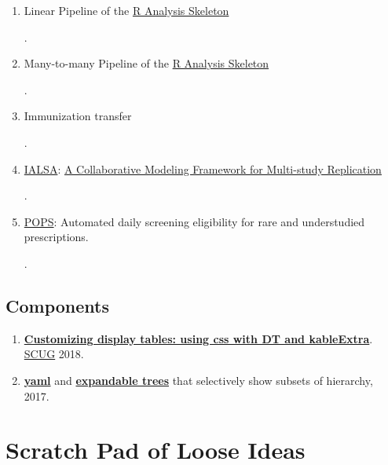 \documentclass[
]{book}
\providecommand{\tightlist}{%
  \setlength{\itemsep}{0pt}\setlength{\parskip}{0pt}}
\begin{document}
\begin{enumerate}
\def\labelenumi{\arabic{enumi}.}
\item
  Linear Pipeline of the \href{https://github.com/wibeasley/RAnalysisSkeleton}{R Analysis Skeleton}

  .
\item
  Many-to-many Pipeline of the \href{https://github.com/wibeasley/RAnalysisSkeleton}{R Analysis Skeleton}

  .
\item
  Immunization transfer

  .
\item
  \href{http://www.ialsa.org/}{IALSA}: \href{https://github.com/IALSA/IALSA-2015-Portland/blob/master/pubs/2016-talks/2016-06-09-cpa/ppt/koval-etal-2016-06-10-cpa.pdf}{A Collaborative Modeling Framework for Multi-study Replication}

  .
\item
  \href{https://github.com/OuhscBbmc/darden-pharmaco-1}{POPS}: Automated daily screening eligibility for rare and understudied prescriptions.

  .
\end{enumerate}

\hypertarget{components}{%
\section{Components}\label{components}}

\begin{enumerate}
\def\labelenumi{\arabic{enumi}.}
\tightlist
\item
  \textbf{\href{https://raw.githack.com/OuhscBbmc/StatisticalComputing/master/2018-presentations/10-october/table-styling.html\#/}{Customizing display tables: using css with DT and kableExtra}}. \href{https://github.com/OuhscBbmc/StatisticalComputing}{SCUG} 2018.
\item
  \textbf{\href{https://github.com/wibeasley/class-yaml-2017/blob/master/data-public/raw/miechv-3-outcome-measure.yml}{yaml}} and \textbf{\href{https://rawcdn.githack.com/wibeasley/class-yaml-2017/55ad75a9f69b03fde929c06bb3ec129f25c816a9/analysis/miechv-3-measures/miechv-3-measures.html\#4_trees}{expandable trees}} that selectively show subsets of hierarchy, 2017.
\end{enumerate}

\hypertarget{scratch-pad}{%
\chapter{Scratch Pad of Loose Ideas}\label{scratch-pad}}
\end{document}
